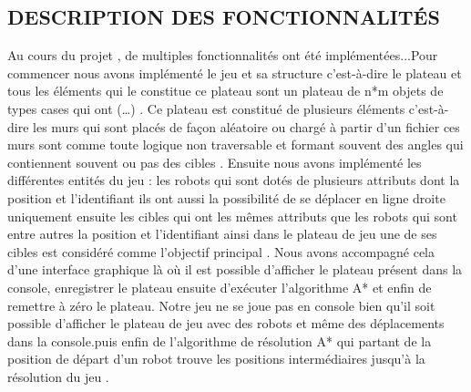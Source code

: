 \documentclass[a4paper]{article} %
\begin{document}
\subsection{DESCRIPTION  DES FONCTIONNALITÉS }
Au cours du projet , de multiples fonctionnalités ont été implémentées...Pour commencer nous avons implémenté le jeu et sa structure c'est-à-dire le plateau et tous les éléments qui le constitue ce plateau sont un plateau de n*m objets de types cases qui ont (…) . Ce plateau est constitué de plusieurs éléments c'est-à-dire les murs qui sont placés de façon aléatoire ou chargé à partir d’un fichier ces murs sont comme toute logique non traversable et formant souvent des angles qui contiennent souvent ou pas des cibles . Ensuite nous avons implémenté les différentes entités du jeu : les robots qui sont dotés de plusieurs attributs dont la position  et l’identifiant ils ont aussi la possibilité de se déplacer en ligne droite uniquement  ensuite les cibles qui ont les mêmes attributs que les robots qui sont entre autres la position et l’identifiant ainsi dans le plateau de jeu une de ses cibles est considéré comme  l'objectif principal . Nous avons accompagné cela d’une interface graphique là où il est possible d'afficher le plateau présent dans la console, enregistrer le plateau  ensuite  d’exécuter l’algorithme A* et enfin de remettre à zéro le plateau. Notre jeu ne se joue pas en console bien qu’il soit possible d’afficher le plateau de jeu avec des robots et même des déplacements dans la console.puis enfin de l’algorithme de résolution A* qui partant de la position de départ d’un robot trouve les positions intermédiaires jusqu’à la résolution du jeu . 
\end{document}
